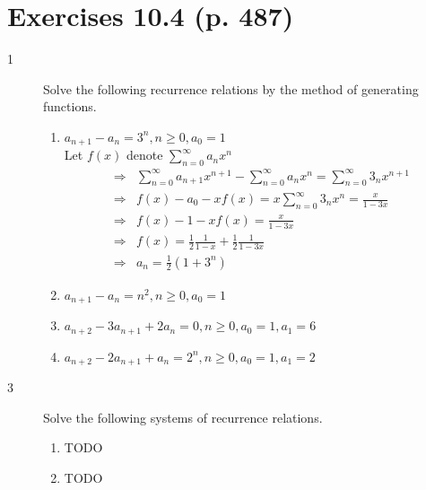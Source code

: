 \documentclass[a4paper]{article}
\begin{document}
\section*{Exercises 10.4 (p. 487) }
\begin{description}
\item[1] Solve the following recurrence relations by the method of generating functions.
\begin{enumerate}[label=\alph*)]
    \item $a_{n+1}-a_n=3^n,n\geq 0, a_0=1$\\
    Let $f(x)$ denote $\sum_{n=0}^{\infty}{a_nx^n}$
    \begin{align*}
    \Rightarrow&\sum_{n=0}^{\infty}{a_{n+1}x^{n+1}} - \sum_{n=0}^{\infty}{a_nx^n} = \sum_{n=0}^{\infty}{3_nx^{n+1}}\\
    \Rightarrow& f(x)-a_0-xf(x)=x\sum_{n=0}^{\infty}{3_nx^{n}}=\frac{x}{1-3x}\\
    \Rightarrow& f(x)-1-xf(x)=\frac{x}{1-3x}\\
    \Rightarrow&f(x)=\frac{1}{2}\frac{1}{1-x}+\frac{1}{2}\frac{1}{1-3x}\\
    \Rightarrow&a_n=\frac{1}{2}(1+3^n)
    \end{align*}
    \item $a_{n+1}-a_n=n^2,n\geq 0,a_0=1$
    \item $a_{n+2}-3a_{n+1}+2a_n=0,n\geq 0,a_0=1,a_1=6$
    \item $a_{n+2}-2a_{n+1}+a_n=2^n,n\geq 0,a_0=1,a_1=2$
\end{enumerate}

\item[3] Solve the following systems of recurrence relations.
\begin{enumerate}[label=\alph*)]
    \item TODO
    \item TODO
\end{enumerate}
\end{description}
\end{document}
